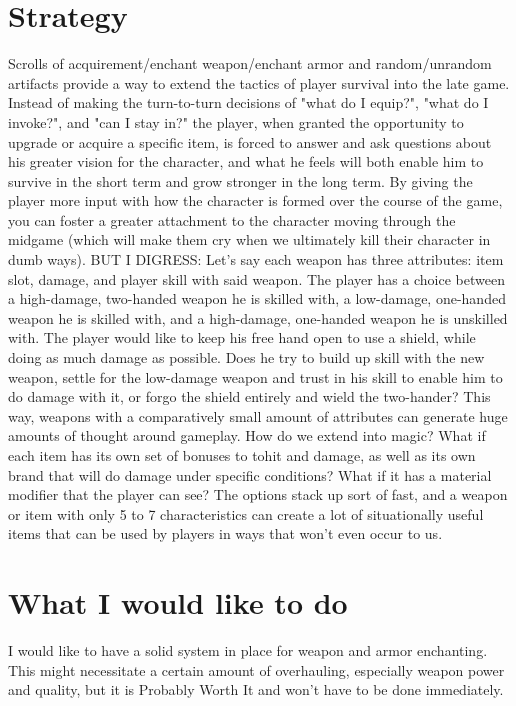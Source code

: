 \documentclass[a4paper,11pt]{article}
\begin{document}
\section{Strategy} 
Scrolls of acquirement/enchant weapon/enchant armor and random/unrandom artifacts provide a way to extend the tactics of player survival into the late game. Instead of making the turn-to-turn decisions of "what do I equip?", "what do I invoke?", and "can I stay in?" the player, when granted the opportunity to upgrade or acquire a specific item, is forced to answer and ask questions about his greater vision for the character, and what he feels will both enable him to survive in the short term and grow stronger in the long term. By giving the player more input with how the character is formed over the course of the game, you can foster a greater attachment to the character moving through the midgame (which will make them cry when we ultimately kill their character in dumb ways). BUT I DIGRESS: Let's say each weapon has three attributes: item slot, damage, and player skill with said weapon. The player has a choice between a high-damage, two-handed weapon he is skilled with, a low-damage, one-handed weapon he is skilled with, and a high-damage, one-handed weapon he is unskilled with. The player would like to keep his free hand open to use a shield, while doing as much damage as possible. Does he try to build up skill with the new weapon, settle for the low-damage weapon and trust in his skill to enable him to do damage with it, or forgo the shield entirely and wield the two-hander? This way, weapons with a comparatively small amount of attributes can generate huge amounts of thought around gameplay. How do we extend into magic? What if each item has its own set of bonuses to tohit and damage, as well as its own brand that will do damage under specific conditions? What if it has a material modifier that the player can see? The options stack up sort of fast, and a weapon or item with only 5 to 7 characteristics can create a lot of situationally useful items that can be used by players in ways that won't even occur to us.

\section{What I would like to do}
I would like to have a solid system in place for weapon and armor enchanting. This might necessitate a certain amount of overhauling, especially weapon power and quality, but it is Probably Worth It and won't have to be done immediately.
\end{document}

